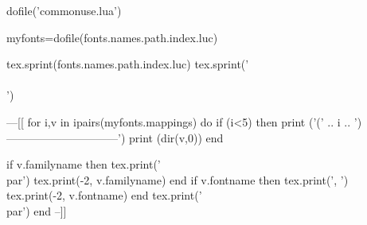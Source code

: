 \documentclass{article}
\begin{document}
\begin{luacode*}

dofile('commonuse.lua')

myfonts=dofile(fonts.names.path.index.luc)

tex.sprint(fonts.names.path.index.luc)
tex.sprint('\\\\')

---[[
for i,v in ipairs(myfonts.mappings) do
 if (i<5) then
   print ('\n(' .. i .. ')------------------------------')
   print (dir(v,0))
 end

 if v.familyname then
 tex.print('\\par')
 tex.print(-2, v.familyname)
 end
 if v.fontname then 
 tex.print(', ')
 tex.print(-2, v.fontname)
 end
 tex.print('\\par')
end
--]]

\end{luacode*}
\end{document}
